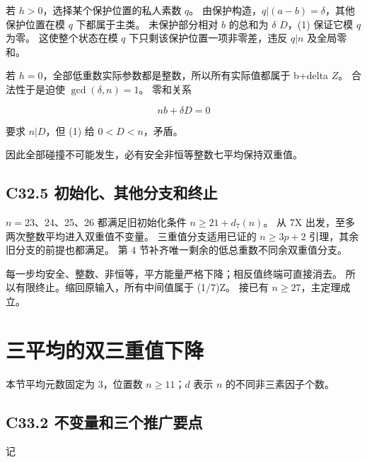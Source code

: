 \documentclass[11pt,a4paper]{article}
\theoremstyle{definition}
\numberwithin{equation}{section}
\begin{document}
{若} {\ensuremath{h>0}，选择某个保护位置的私人素数} {\ensuremath{q}。} {由保护构造，\ensuremath{q|(a-b)=\delta }，其他保护位置在模} {\ensuremath{q}} {下都属于主类。} {未保护部分相对} {\ensuremath{b}} {的总和为} {\ensuremath{\delta }} {\ensuremath{D}，(1)} {保证它模} {\ensuremath{q}} {为零。} {这使整个状态在模} {\ensuremath{q}} {下只剩该保护位置一项非零差，违反} {\ensuremath{q|n}} {及全局零和。}

{若} {\ensuremath{h=0}，全部低重数实际参数都是整数，所以所有实际值都属于} {b+delta} {\ensuremath{Z}。} {合法性于是迫使} {\ensuremath{\operatorname{gcd}(\delta ,n)=1}。} {零和关系}

\[
nb+\delta D=0
\]

{要求} {\ensuremath{n|D}，但} {(1)} {给} {\ensuremath{0<D<n}，矛盾。}

{因此全部碰撞不可能发生，必有安全非恒等整数七平均保持双重值。}

\subsection*{\texorpdfstring{{C32.5} {初始化、其他分支和终止}}{C32.5 初始化、其他分支和终止}}\label{C32-h211}

{\ensuremath{n=23}、24、25、26} {都满足旧初始化条件} {\ensuremath{n\ge 21+d_{7}(n)}。} {从} {7X} {出发，至多两次整数平均进入双重值不变量。} {三重值分支适用已证的} {\ensuremath{n\ge 3p+2}} {引理，其余旧分支的前提也都满足。} {第} {4} {节补齐唯一剩余的低总重数不同余双重值分支。}

{每一步均安全、整数、非恒等，平方能量严格下降；相反值终端可直接消去。} {所以有限终止。缩回原输入，所有中间值属于} {(1/7)Z。} {接已有} {\ensuremath{n\ge 27}，主定理成立。}


\section{三平均的双三重值下降}\label{construct:triple-tail}
{本节平均元数固定为} \(3\){，位置数} \(n\ge11\){；}\(d\) {表示} \(n\) {的不同非三素因子个数。}

\subsection*{\texorpdfstring{{C33.2} {不变量和三个推广要点}}{C33.2 不变量和三个推广要点}}\label{C33-h212}

{记}
\end{document}
